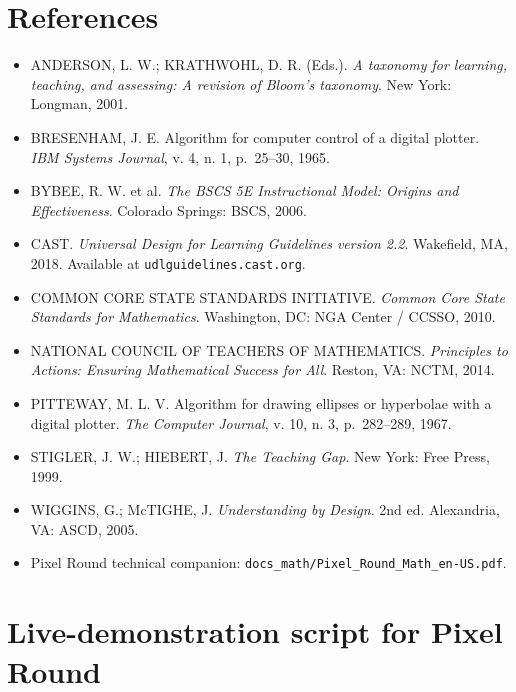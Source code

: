 \documentclass[12pt,letterpaper]{scrartcl}
\begin{document}
\section{References}

\begin{itemize}[leftmargin=1.3em,itemsep=0.2em,topsep=0.3em]
  \item ANDERSON, L. W.; KRATHWOHL, D. R. (Eds.). \emph{A taxonomy for learning, teaching, and assessing: A revision of Bloom's taxonomy}. New York: Longman, 2001.
  \item BRESENHAM, J. E. Algorithm for computer control of a digital plotter. \emph{IBM Systems Journal}, v. 4, n. 1, p.~25--30, 1965.
  \item BYBEE, R. W. et al. \emph{The BSCS 5E Instructional Model: Origins and Effectiveness}. Colorado Springs: BSCS, 2006.
  \item CAST. \emph{Universal Design for Learning Guidelines version 2.2}. Wakefield, MA, 2018. Available at \texttt{udlguidelines.cast.org}.
  \item COMMON CORE STATE STANDARDS INITIATIVE. \emph{Common Core State Standards for Mathematics}. Washington, DC: NGA Center / CCSSO, 2010.
  \item NATIONAL COUNCIL OF TEACHERS OF MATHEMATICS. \emph{Principles to Actions: Ensuring Mathematical Success for All}. Reston, VA: NCTM, 2014.
  \item PITTEWAY, M. L. V. Algorithm for drawing ellipses or hyperbolae with a digital plotter. \emph{The Computer Journal}, v. 10, n. 3, p.~282--289, 1967.
  \item STIGLER, J. W.; HIEBERT, J. \emph{The Teaching Gap}. New York: Free Press, 1999.
  \item WIGGINS, G.; McTIGHE, J. \emph{Understanding by Design}. 2nd ed. Alexandria, VA: ASCD, 2005.
  \item Pixel Round technical companion: \texttt{docs\_math/Pixel\_Round\_Math\_en-US.pdf}.
\end{itemize}

\newpage
\appendix
\renewcommand{\thesection}{\Alph{section}}
\setcounter{section}{0}

\section{Live-demonstration script for Pixel Round}\label{ap:script}
\end{document}
